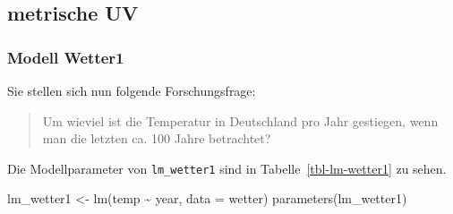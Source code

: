 \documentclass[
  a4paper,
]{scrbook}
\newenvironment{Shaded}{\begin{snugshade}}{\end{snugshade}}
\newcommand{\AttributeTok}[1]{\textcolor[rgb]{0.40,0.45,0.13}{#1}}
\newcommand{\FunctionTok}[1]{\textcolor[rgb]{0.28,0.35,0.67}{#1}}
\newcommand{\NormalTok}[1]{\textcolor[rgb]{0.00,0.23,0.31}{#1}}
\newcommand{\OtherTok}[1]{\textcolor[rgb]{0.00,0.23,0.31}{#1}}
\newcommand{\SpecialCharTok}[1]{\textcolor[rgb]{0.37,0.37,0.37}{#1}}
\theoremstyle{definition}
\theoremstyle{definition}
\theoremstyle{definition}
\theoremstyle{remark}
\begin{document}
\subsection{metrische UV}\label{metrische-uv}

\subsubsection{Modell Wetter1}\label{modell-wetter1}

Sie stellen sich nun folgende Forschungsfrage:

\begin{quote}
{} Um wieviel ist die Temperatur in Deutschland pro Jahr
gestiegen, wenn man die letzten ca. 100 Jahre betrachtet?
\end{quote}

Die Modellparameter von \texttt{lm\_wetter1} sind in
Tabelle~\ref{tbl-lm-wetter1} zu sehen.

\begin{Shaded}
\begin{Highlighting}[]
\NormalTok{lm\_wetter1 }\OtherTok{\textless{}{-}} \FunctionTok{lm}\NormalTok{(temp }\SpecialCharTok{\textasciitilde{}}\NormalTok{ year, }\AttributeTok{data =}\NormalTok{ wetter)}
\FunctionTok{parameters}\NormalTok{(lm\_wetter1)}
\end{Highlighting}
\end{Shaded}
\end{document}
